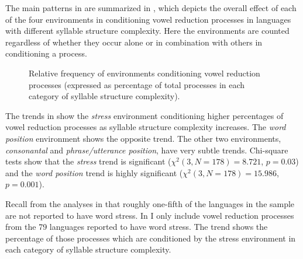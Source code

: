   The main patterns in  are summarized in , which depicts the overall effect of each of the four environments in conditioning vowel reduction processes in languages with different syllable structure complexity. Here the environments are counted regardless of whether they occur alone or in combination with others in conditioning a process.

  
\begin{figure}
\caption{\label{fig:6.2} Relative frequency of environments conditioning vowel reduction processes (expressed as percentage of total processes in each category of syllable structure complexity).}
\end{figure}

  The trends in  show the \textit{stress} environment conditioning higher percentages of vowel reduction processes as syllable structure complexity increases. The \textit{word position} environment shows the opposite trend. The other two environments, \textit{consonantal} and \textit{phrase/utterance position}, have very subtle trends. Chi-square tests show that the \textit{stress} trend is significant ($\chi^2(3, N = 178) = 8.721$, $p = 0.03$) and the \textit{word position} trend is highly significant ($\chi^2(3, N = 178) = 15.986$, $p = 0.001$).

  Recall from the analyses in  that roughly one-fifth of the languages in the sample are not reported to have word stress. In  I only include vowel reduction processes from the 79 languages reported to have word stress. The trend shows the percentage of those processes which are conditioned by the stress environment in each category of syllable structure complexity.

